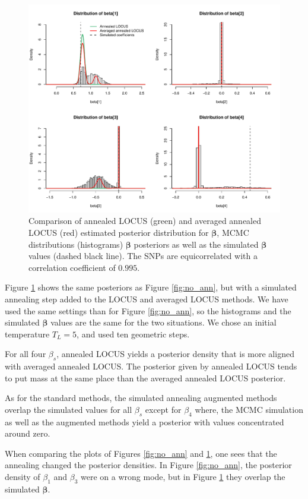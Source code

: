 \documentclass[a4paper, 11pt]{report}
\numberwithin{equation}{chapter}
\begin{document}
\begin{figure}[h]
\centering
\includegraphics[width=\textwidth, bb=0 0 9.8in 8.07in]{images/MCMC_anneal.pdf}
\caption{\label{fig:ann}Comparison of annealed LOCUS (green) and averaged annealed LOCUS (red) estimated posterior distribution for $\boldsymbol{\beta}$, MCMC distributions (histograms) $\boldsymbol{\beta}$ posteriors as well as the simulated $\boldsymbol{\beta}$ values (dashed black line). The SNPs are equicorrelated with a correlation coefficient of $0.995$.}
\end{figure}
Figure \ref{fig:ann} shows the same posteriors as Figure \ref{fig:no_ann}, but with a simulated annealing step added to the LOCUS and averaged LOCUS methods. We have used the same settings than for Figure \ref{fig:no_ann}, so the histograms and the simulated $
\boldsymbol{\beta}$ values are the same for the two situations. We chose an initial temperature $T_L = 5$, and used ten geometric steps.

For all four $\beta_s$, annealed LOCUS yields a posterior density that is more aligned with averaged annealed LOCUS. The posterior given by annealed LOCUS tends to put mass at the same place than the averaged annealed LOCUS posterior.

As for the standard methods, the simulated annealing augmented methods overlap the simulated values for all $\beta_s$ except for $\beta_4$ where, the MCMC simulation as well as the augmented methods yield a posterior with values concentrated around zero.

When comparing the plots of Figures \ref{fig:no_ann} and \ref{fig:ann}, one sees that the annealing changed the posterior densities. In Figure \ref{fig:no_ann}, the posterior density of $\beta_1$ and $\beta_3$ were on a wrong mode, but in Figure \ref{fig:ann} they overlap the simulated $\boldsymbol{\beta}$. 
\end{document}
